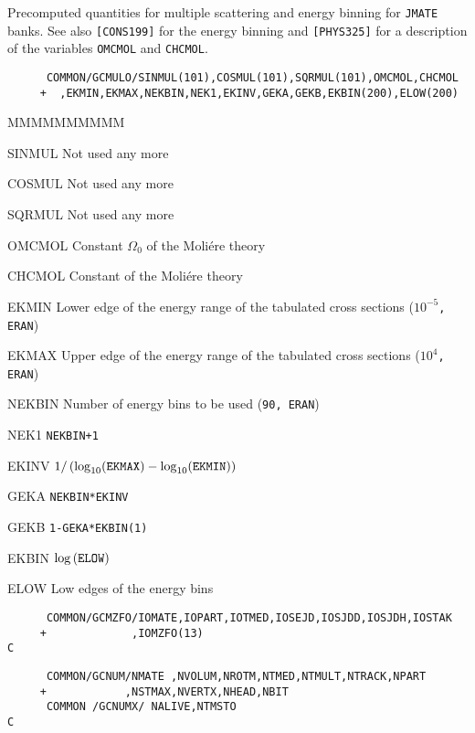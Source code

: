 Precomputed quantities for multiple scattering and energy binning for
{\tt JMATE} banks. See also {\tt [CONS199]} for the energy binning and
{\tt [PHYS325]} for a description of the variables {\tt OMCMOL} and
{\tt CHCMOL}.
\begin{verbatim}
      COMMON/GCMULO/SINMUL(101),COSMUL(101),SQRMUL(101),OMCMOL,CHCMOL
     +  ,EKMIN,EKMAX,NEKBIN,NEK1,EKINV,GEKA,GEKB,EKBIN(200),ELOW(200)
\end{verbatim}
\begin{DLtt}{MMMMMMMMMM}
\item[SINMUL]  Not used any more
\item[COSMUL]  Not used any more
\item[SQRMUL]  Not used any more
\item[OMCMOL]  Constant $\Omega_0$ of the Moli\'ere theory
\item[CHCMOL]  Constant of the Moli\'ere theory
\item[EKMIN]   Lower edge of the energy range of the tabulated cross
sections ({\tt $10^{-5}$, ERAN})
\item[EKMAX]   Upper edge of the energy range of the tabulated cross
sections ({\tt $10^{4}$, ERAN})
\item[NEKBIN]    Number of energy bins to be used ({\tt 90, ERAN})
\item[NEK1]    {\tt NEKBIN+1}
\item[EKINV]   $1/ \left ( \log_{10}({\tt EKMAX})-
\log_{10}({\tt EKMIN}) \right )$
\item[GEKA]    {\tt NEKBIN*EKINV}
\item[GEKB]    {\tt 1-GEKA*EKBIN(1)}
\item[EKBIN]   $\log \left ( {\tt ELOW} \right ) $
\item[ELOW]    Low edges of the energy bins
\end{DLtt}
\begin{verbatim}
      COMMON/GCMZFO/IOMATE,IOPART,IOTMED,IOSEJD,IOSJDD,IOSJDH,IOSTAK
     +             ,IOMZFO(13)
C
\end{verbatim}
\begin{verbatim}
      COMMON/GCNUM/NMATE ,NVOLUM,NROTM,NTMED,NTMULT,NTRACK,NPART
     +            ,NSTMAX,NVERTX,NHEAD,NBIT
      COMMON /GCNUMX/ NALIVE,NTMSTO
C
\end{verbatim}
